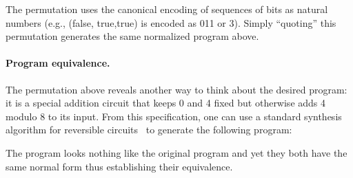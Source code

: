 \resetperm{}

\noindent The permutation uses the canonical encoding of sequences of bits as natural numbers (e.g., (\textsf{false},
\textsf{true},\textsf{true}) is encoded as 011 or 3).  Simply ``quoting'' this permutation generates the same normalized
program  above.

\paragraph*{Program equivalence.} The permutation above reveals another way to think about the desired program: it is a
special addition circuit that keeps 0 and 4 fixed but otherwise adds 4 modulo 8 to its input. From this specification,
one can use a standard synthesis algorithm for reversible circuits~\cite{10.1145/775832.775915} to generate the
following program:

\adder{}

The  program looks nothing like the original  program and yet they both have the same normal
form thus establishing their equivalence.




